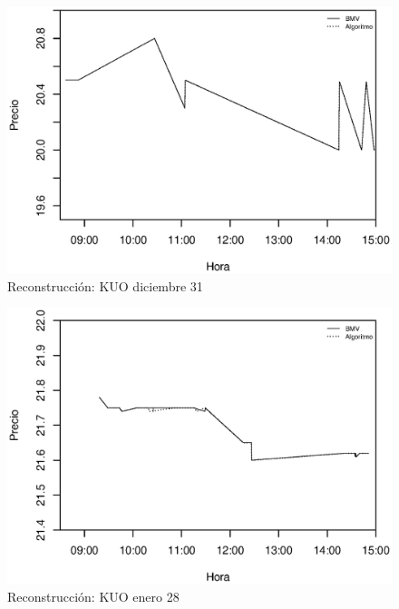 \documentclass[11pt]{article}
\numberwithin{equation}{section} %
\begin{document}
\begin{figure}[htbp] \centering
\includegraphics[scale=0.75, trim=0 0.5cm 0 1.5cm]{kuo123110.eps}
\caption{Reconstrucción: KUO diciembre 31}
\label{kuo1231}
\end{figure}

\begin{figure}[htbp] \centering
\includegraphics[scale=0.75, trim=0 0.5cm 0 1.5cm]{kuo012811.eps}
\caption{Reconstrucción: KUO enero 28}
\label{kuo0128}
\end{figure}
\end{document}
